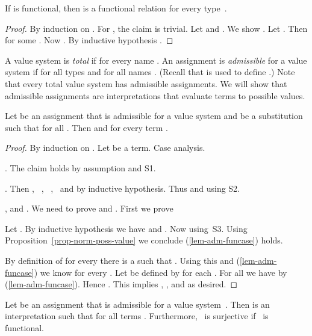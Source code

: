 \begin{prop}
  \label{prop-functional-vs}
  If  is functional, then  is a
  functional relation for every type~.
\end{prop}

\begin{proof}
  By induction on .  For , the
  claim is trivial.  Let  and
  .  We show .  Let
  .  Then  for some .
  Now .  By inductive hypothesis
  .
\end{proof}

A value system  is \emph{total} if
 for every name .  An
assignment  is \emph{admissible} for a value
system  if  for all
types  and  for all names .
(Recall that  is used to define .) Note that every total value system has admissible
assignments.  We will show that admissible
assignments are interpretations that
evaluate terms to possible values.


\begin{lem}
  \label{lem-admissibility}
  Let  be an assignment that is admissible
  for a value system  and  be a
  substitution such that  for
  all .  Then  and
   for every term .
\end{lem}

\begin{proof}
  By induction on .  Let  be a term.  Case
  analysis.

  \br .  The claim holds by assumption and S1.

  \br .  Then , \
  , \
  , \ and
   by inductive
  hypothesis.  Thus  and
   using S2.

  \br ,  and .  
  We need to prove  and .
  First we prove
  
  Let .  
  By inductive hypothesis we have 
  and .
  Now
   using~S3.
  Using Proposition~\ref{prop-norm-poss-value} we conclude (\ref{lem-adm-funcase}) holds.

  By definition of  for every  there is a  such that .
  Using this and (\ref{lem-adm-funcase}) we know  for every .
  Let  be defined by 
  for each .  
  For all  we have  by (\ref{lem-adm-funcase}).
  Hence .
  This implies , , 
  and  as desired.
\end{proof}

\begin{thm}
  \label{theo-admissible-interpretations}
  Let  be an assignment that is admissible
  for a value system~.  Then  is an
  interpretation such that  for all
  terms .  Furthermore, ~is surjective
  if~ is functional.
\end{thm}


